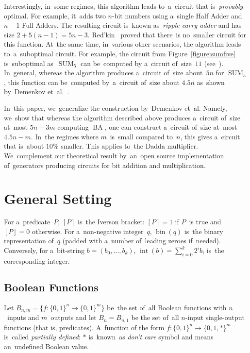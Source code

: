 \documentclass[sigconf, review, anonymous]{acmart}
\DeclareMathOperator{\SUM}{SUM}
\DeclareMathOperator{\BA}{BA}
\begin{document}
Interestingly, in~some regimes, this algorithm leads to~a~circuit
that is~\emph{provably} optimal. For example, it~adds two $n$-bit
numbers using a~single Half Adder and $n-1$ Full Adders. The resulting
circuit is~known as~\emph{ripple-carry adder} and has size $2+5(n-1)=5n-3$. Red'kin~\cite{Red81} proved
that there~is no~smaller circuit for this function.
At~the same time, in~various other scenarios, the algorithm leads
to~a~suboptimal circuit. For example, the circuit from Figure~\ref{figure:sumfive} is~suboptimal as~$\SUM_5$
can be~computed by a~circuit of~size~$11$ (see~\cite{DBLP:conf/mfcs/KulikovPS22}).
In~general, whereas the algorithm produces a~circuit of~size about~$5n$
for $\SUM_5$, this function can be~computed by~a~circuit of~size about $4.5n$
as~shown by~Demenkov et~al.~\cite{DBLP:journals/ipl/DemenkovKKY10}.

In~this paper, we~generalize the construction by~Demenkov et~al.
Namely, we~show that whereas the algorithm described above produces
a~circuit of~size at~most $5n-3m$ computing $\BA$, one can construct
a~circuit of~size at~most $4.5n-m$. In~the regimes where $m$~is~small
compared to~$n$, this gives a~circuit that is~about $10\%$ smaller.
This applies to~the Dadda multiplier.
We~complement our theoretical result by~an~open source implementation
of~generators producing circuits for bit addition and multiplication.

\section{General Setting}
For a~predicate~$P$, $[P]$ is~the Iverson bracket: $[P]=1$ if $P$~is true and $[P]=0$ otherwise. For a~non-negative integer~$q$,
$\operatorname{bin}(q)$ is~the binary representation of~$q$
(padded with a~number of~leading zeroes if~needed).
Conversely, for a~bit-string $b=(b_0,\dotsc, b_k)$, $\operatorname{int}(b)=\sum_{i=0}^{k}2^ib_i$ is~the corresponding integer.

\subsection{Boolean Functions}
Let $B_{n,m}=\{f \colon \{0,1\}^n \to \{0,1\}^m\}$ be~the set of~all Boolean functions with $n$~inputs and $m$~outputs
and let $B_n=B_{n,1}$ be the set of~all $n$-input single-output functions
(that is, predicates).
A~function of the form $f \colon \{0,1\}^n \to \{0,1,*\}^m$
is~called \emph{partially defined}: $*$ is~known~as \emph{don't care} symbol
and means an~undefined Boolean value.
\end{document}
